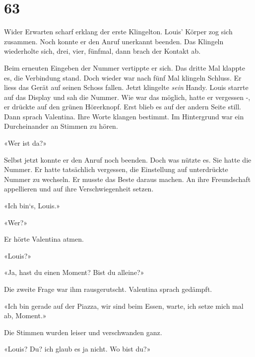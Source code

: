 \chapter{63}



Wider Erwarten scharf erklang der erste Klingelton. Louis’ Körper zog
sich zusammen. Noch konnte er den Anruf unerkannt beenden. Das Klingeln
wiederholte sich, drei, vier, fünfmal, dann brach der Kontakt ab. 

Beim erneuten Eingeben der Nummer vertippte er sich. Das dritte Mal klappte es, die Verbindung stand. 
Doch wieder war nach fünf Mal klingeln Schluss. Er liess das Gerät auf seinen Schoss fallen.
Jetzt klingelte \emph{sein} Handy. Louis starrte auf das Display und sah die Nummer. Wie war das möglich, hatte
er vergessen -, er drückte auf den grünen Hörerknopf. Erst blieb es auf der andern Seite still.
Dann sprach Valentina. Ihre Worte klangen bestimmt. Im Hintergrund war
ein Durcheinander an Stimmen zu hören.

«Wer ist da?»

Selbst jetzt konnte er den Anruf noch beenden. Doch was nützte es. Sie
hatte die Nummer. Er hatte tatsächlich vergessen, die Einstellung auf
unterdrückte Nummer zu wechseln. Er musste das Beste daraus machen. An ihre
Freundschaft appellieren und auf ihre Verschwiegenheit setzen.

«Ich bin`s, Louis.»

«Wer?»

Er hörte Valentina atmen.

«Louis?»

«Ja, hast du einen Moment? Bist du alleine?»

Die zweite Frage war ihm rausgerutscht. Valentina sprach gedämpft.

«Ich bin gerade auf der Piazza, wir sind beim Essen, warte, ich setze
mich mal ab, Moment.»

Die Stimmen wurden leiser und verschwanden ganz.

«Louis? Du? ich glaub es ja nicht. Wo bist du?»
